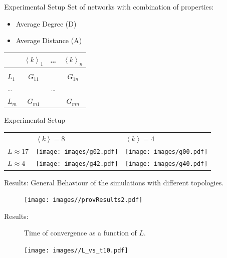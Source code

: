 \documentclass[12pt, notes=show]{beamer}
\begin{document}
	\begin{frame}{Experimental Setup}
		Set of networks with combination of properties:
		\begin{itemize}
			\item Average Degree (D)
			\item Average Distance (A)
		\end{itemize}
		\begin{center}
			\begin{tabular}{l|ccc}
				& $\left\langle k \right\rangle_1$ & \dots & $\left\langle k \right\rangle_n$\\
				\hline\\
				$L_1$	& $G_{11}$	& 	& $G_{1n}$	\\	
				\dots	&		&\dots	&		\\
				$L_m$	& $G_{m1}$	& 	& $G_{mn}$	\\	
			\end{tabular}
		\end{center}

	\end{frame}
	\begin{frame}{Experimental Setup}
		\begin{table}
			\centering
			\begin{tabular}{m{1.2cm}m{2.5cm}m{2.5cm}}
				&$\left\langle k\right\rangle=8$ & $\left\langle k\right\rangle=4$\\
				$L\approx17$&
				\texttt{[image: images/g02.pdf]}&
				\texttt{[image: images/g00.pdf]}\\
				$L\approx4$&
				\texttt{[image: images/g42.pdf]}&
				\texttt{[image: images/g40.pdf]}\\
			\end{tabular}
		\end{table}
	\end{frame}



	\begin{frame}{Results: }
					General Behaviour of the simulations with different topologies.
		\begin{figure}[h]
			\begin{center}
						\texttt{[image: images//provResults2.pdf]}
			\end{center}
		\end{figure}

	\end{frame}

	\begin{frame}{Results: }
		\begin{figure}[h]

			Time of convergence as a function of $L$.
			\begin{center}
						\texttt{[image: images//L\_vs\_t10.pdf]}

			\end{center}
		\end{figure}

	\end{frame}
\end{document}
